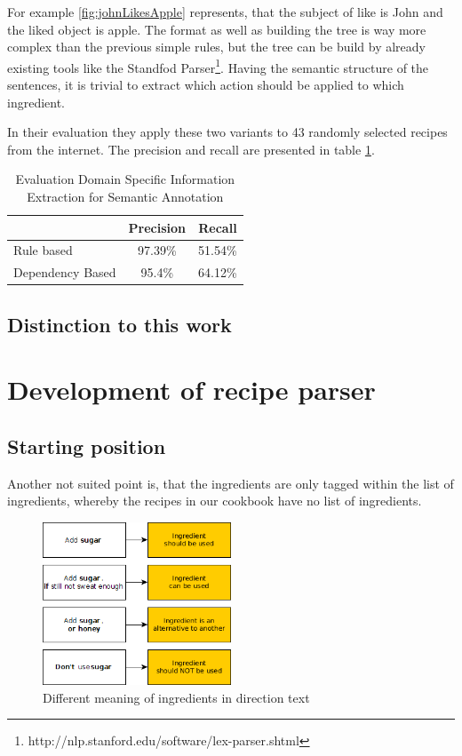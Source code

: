 \documentclass[12pt, twoside]{report}
\begin{document}
For example \cref{fig:johnLikesApple} represents, that the subject of like is John and the liked object is apple.
The format as well as building the tree is way more complex than the previous simple rules, but the tree can be build by already existing tools like the Standfod Parser\footnote{http://nlp.stanford.edu/software/lex-parser.shtml}. Having the semantic structure of the sentences, it is trivial to extract which action should be applied to which ingredient.

In their evaluation they apply these two variants to 43 randomly selected recipes from the internet. The precision and recall are presented in table \ref{tab:masterEval}.

\begin{table}[H]
	\centering
	\begin{tabular}{ l | c | r } 
		& Precision & Recall \\
		\hline
		Rule based & 97.39\% & 51.54\% \\
		Dependency Based & 95.4\% & 64.12\% \\
	\end{tabular}
	\caption{Evaluation Domain Specific Information Extraction for Semantic Annotation}
	\label{tab:masterEval}
\end{table}

\section{Distinction to this work}



\chapter{Development of recipe parser}

\section{Starting position}
Another not suited point is, that the ingredients are only tagged within the list of ingredients, whereby the recipes in our cookbook have no list of ingredients.

\begin{figure}
	\includegraphics[width=0.5\textwidth]{Images/ingredientsInText}
	\caption{Different meaning of ingredients in direction text}
	\label{fig:ingredientsInText}
\end{figure}
\end{document}
